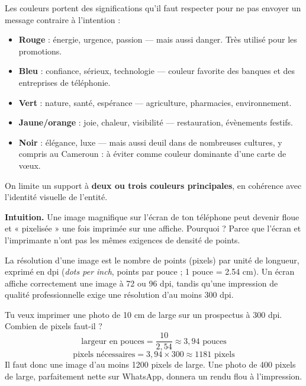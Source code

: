 \documentclass[11pt]{article}
\newcommand{\cle}[1]{{\popxbold\color{popdark}#1}}
\newcounter{popsec}
\newcounter{popsub}
\newcommand{\courssub}[1]{%
  \stepcounter{popsub}%
  \par\vspace{9pt}\noindent{\popxbold\fontsize{11.5}{13}\selectfont\color{popink}{\color{poporange}\thepopsec.\thepopsub}\hspace{6pt}#1}\par\nopagebreak\vspace{4pt}
}
\begin{document}
\begin{propriete}
Les couleurs portent des significations qu'il faut respecter pour ne pas envoyer un message contraire à l'intention :
\begin{itemize}
  \item \textbf{Rouge} : énergie, urgence, passion — mais aussi danger. Très utilisé pour les promotions.
  \item \textbf{Bleu} : confiance, sérieux, technologie — couleur favorite des banques et des entreprises de téléphonie.
  \item \textbf{Vert} : nature, santé, espérance — agriculture, pharmacies, environnement.
  \item \textbf{Jaune/orange} : joie, chaleur, visibilité — restauration, évènements festifs.
  \item \textbf{Noir} : élégance, luxe — mais aussi deuil dans de nombreuses cultures, y compris au Cameroun : à éviter comme couleur dominante d'une carte de vœux.
\end{itemize}
On limite un support à \textbf{deux ou trois couleurs principales}, en cohérence avec l'identité visuelle de l'entité.
\end{propriete}

\courssub{Résolution et impression}

\textbf{Intuition.} Une image magnifique sur l'écran de ton téléphone peut devenir floue et « pixelisée » une fois imprimée sur une affiche. Pourquoi ? Parce que l'écran et l'imprimante n'ont pas les mêmes exigences de densité de points.

\begin{definition}[Résolution]
La \cle{résolution} d'une image est le nombre de points (pixels) par unité de longueur, exprimé en \cle{dpi} (\emph{dots per inch}, points par pouce ; 1 pouce = \num{2,54} cm). Un écran affiche correctement une image à 72 ou 96 dpi, tandis qu'une impression de qualité professionnelle exige une résolution d'au moins \cle{300 dpi}.
\end{definition}

\begin{exemplebox}
Tu veux imprimer une photo de 10 cm de large sur un prospectus à 300 dpi. Combien de pixels faut-il ?
\[ \text{largeur en pouces} = \frac{10}{2{,}54} \approx 3{,}94 \text{ pouces} \]
\[ \text{pixels nécessaires} = 3{,}94 \times 300 \approx 1181 \text{ pixels} \]
Il faut donc une image d'au moins 1200 pixels de large. Une photo de 400 pixels de large, parfaitement nette sur WhatsApp, donnera un rendu flou à l'impression.
\end{exemplebox}
\end{document}
